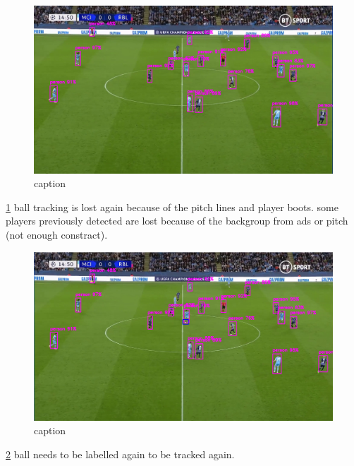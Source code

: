 \documentclass[
11pt,
twoside
]{report}
\begin{document}
\begin{figure}[H]
    \includegraphics[keepaspectratio, width=\columnwidth]{Screenshot_2022-03-03_21-38-04.png}
    \caption{caption}
    \label{img:5}
\end{figure}
\ref{img:5} ball
tracking is lost again because of the pitch lines and player boots. some
players previously detected are lost because of the backgroup from ads
or pitch (not enough constract).

\begin{figure}[H]
    \includegraphics[keepaspectratio, width=\columnwidth]{Screenshot_2022-03-03_21-36-47.png}
    \caption{caption}
    \label{img:6}
\end{figure}
\ref{img:6} ball needs
to be labelled again to be tracked again.
\end{document}
